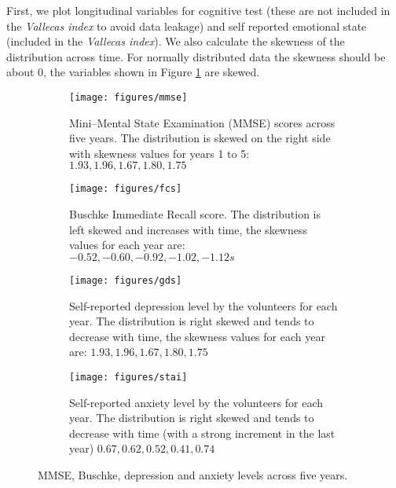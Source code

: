 \documentclass[11pt]{article}
\theoremstyle{definition}
\theoremstyle{remark}
\begin{document}

First, we plot longitudinal variables for cognitive test (these are not included in the \emph{Vallecas index} to avoid data leakage) and self reported emotional state (included in the \emph{Vallecas index}). We also calculate the skewness of the distribution across time. For normally distributed data the skewness should be about 0, the variables shown in Figure \ref{fig:staigds} are skewed. 

\begin{figure}[H]
    \centering
    \begin{subfigure}[t]{\textwidth}
        \centering
        \texttt{[image: figures/mmse]}
        \caption{Mini–Mental State Examination (MMSE) scores across five years. The distribution is skewed on the right side with skewness values for years 1 to 5: $1.93, 1.96, 1.67, 1.80, 1.75$}
    \end{subfigure}
    
    \begin{subfigure}[t]{\textwidth}
        \centering
        \texttt{[image: figures/fcs]}
        \caption{Buschke Immediate Recall score. The distribution is left skewed and increases with time, the skewness values for each year are: $-0.52, -0.60, -0.92, -1.02, -1.12s$ }
    \end{subfigure}%
    
     \begin{subfigure}[t]{\textwidth}
        \centering
        \texttt{[image: figures/gds]}
        \caption{Self-reported depression level by the volunteers for each year. The distribution is right skewed and tends to decrease with time, the skewness values for each year are: $1.93, 1.96, 1.67, 1.80, 1.75$ }
    \end{subfigure}
    
    \begin{subfigure}[t]{\textwidth}
        \centering
        \texttt{[image: figures/stai]}
        \caption{Self-reported anxiety level by the volunteers for each year. The distribution is right skewed and tends to decrease with time (with a strong increment in the last year) $0.67, 0.62, 0.52, 0.41, 0.74$}
    \end{subfigure}%
    \caption{MMSE, Buschke, depression and anxiety levels across five years.} \label{fig:staigds}
\end{figure}
\end{document}
